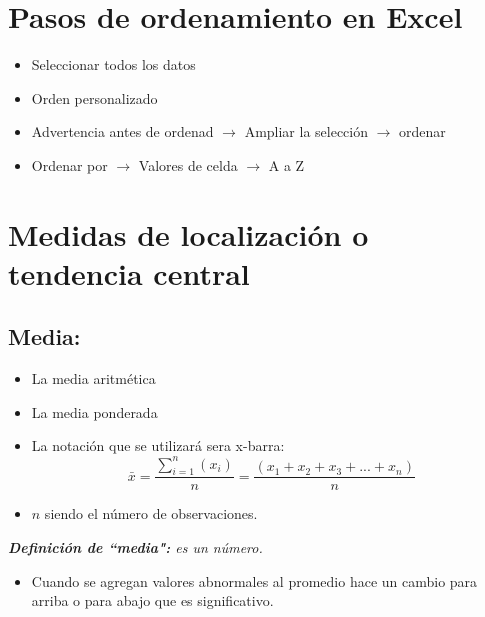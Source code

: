 \section{Pasos de ordenamiento en Excel}
\begin{itemize}[label=$\downarrow$]
    \item Seleccionar todos los datos 
    \item Orden personalizado
    \item Advertencia antes de ordenad $\rightarrow$ Ampliar la selección $\rightarrow$ ordenar 
    \item Ordenar por $\rightarrow$ Valores de celda $\rightarrow$ A a Z
\end{itemize}
\section{Medidas de localización o tendencia central}   
\subsection{Media:}
\begin{itemize}
    \item La media aritmética 
    \item La media ponderada
\end{itemize}
\begin{itemize}
    \item La notación que se utilizará sera x-barra:
        \[
            \bar{x} = \frac{\sum_{i=1}^{n}(x_{i})}{n} = \frac{(x_{1} + x_{2} + x_{3} + ... + x_{n})}{n} 
        \]
    
    \item $n$ siendo el número de observaciones.
\end{itemize}
\emph{\textbf{Definición de ``media":} es un número.}
\begin{itemize}
    \item Cuando se agregan valores abnormales al promedio hace un cambio para arriba o para abajo que es significativo.
\end{itemize}

